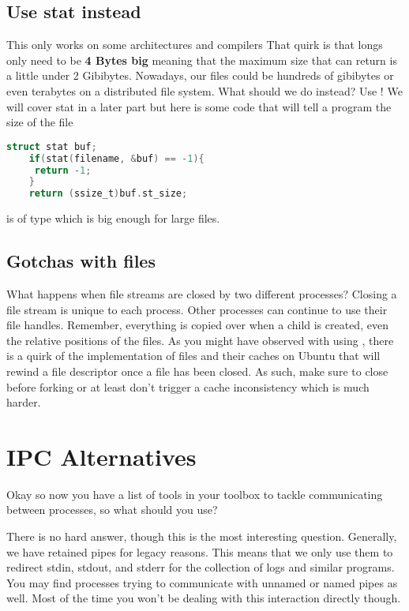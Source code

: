 \subsection{Use stat instead}
	 
This only works on some architectures and compilers
That quirk is that longs only need to be \textbf{4 Bytes big} meaning that the maximum size that  can return is a little under 2 Gibibytes.
Nowadays, our files could be hundreds of gibibytes or even terabytes on a distributed file system.
What should we do instead? Use ! We will cover stat in a later part but here is some code that will tell a program the size of the file
	 
\begin{lstlisting}[language=C]
	struct stat buf;
	if(stat(filename, &buf) == -1){
	 return -1;
	}
	return (ssize_t)buf.st_size;
\end{lstlisting}
	 
 is of type  which is big enough for large files.
	 
\subsection{Gotchas with files}
	 
What happens when file streams are closed by two different processes?
Closing a file stream is unique to each process.
Other processes can continue to use their file handles.
Remember, everything is copied over when a child is created, even the relative positions of the files.
As you might have observed with using , there is a quirk of the implementation of files and their caches on Ubuntu that will rewind a file descriptor once a file has been closed.
As such, make sure to close before forking or at least don't trigger a cache inconsistency which is much harder.
	 
\section{IPC Alternatives}
	 
Okay so now you have a list of tools in your toolbox to tackle communicating between processes, so what should you use?
	 
There is no hard answer, though this is the most interesting question.
Generally, we have retained pipes for legacy reasons.
This means that we only use them to redirect stdin, stdout, and stderr for the collection of logs and similar programs.
You may find processes trying to communicate with unnamed or named pipes as well.
Most of the time you won't be dealing with this interaction directly though.
	 
